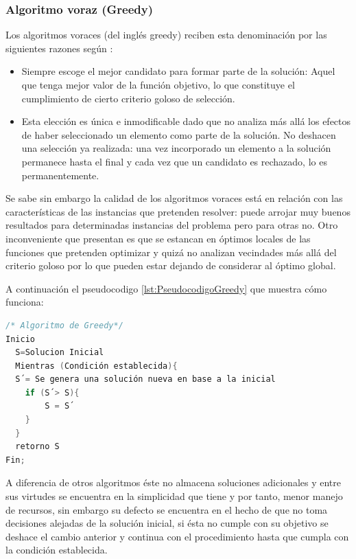 \subsubsection {Algoritmo voraz (Greedy)}
Los algoritmos voraces (del inglés greedy) reciben esta denominación por las siguientes razones según \cite{[CORMENL]}:
\begin{itemize}
\item Siempre escoge el mejor candidato para formar parte de la solución: Aquel que tenga mejor valor de la función objetivo, lo que constituye el cumplimiento de cierto criterio goloso de selección.
\item Esta elección es única e inmodificable dado que no analiza más allá los efectos de haber seleccionado un elemento como parte de la solución. No deshacen una selección ya realizada: una vez incorporado un elemento a la solución permanece hasta el final y cada vez que un candidato es rechazado, lo es permanentemente.
\end{itemize}
\hspace*{1cm}Se sabe sin embargo la calidad de los algoritmos voraces está en relación con las características de las instancias que pretenden resolver: puede arrojar muy buenos resultados para determinadas instancias del problema pero para otras no. Otro inconveniente que presentan es que se estancan en óptimos locales de las funciones que pretenden optimizar y quizá no analizan vecindades más allá del criterio goloso por lo que pueden estar dejando de considerar al óptimo global.

A continuación el pseudocodigo \ref{lst:PseudocodigoGreedy} que muestra cómo funciona:
\begin{lstlisting}[language=C++, caption=Pseudocódigo base para el algoritmo greedy., label=lst:PseudocodigoGreedy]
/* Algoritmo de Greedy*/
Inicio
  S=Solucion Inicial
  Mientras (Condición establecida){
  S´= Se genera una solución nueva en base a la inicial
    if (S´> S){
        S = S´
    }
  }
  retorno S
Fin;
\end{lstlisting}

\hspace*{1cm}A diferencia de otros algoritmos éste no almacena soluciones adicionales y entre sus virtudes se encuentra en la simplicidad que tiene y por tanto, menor manejo de recursos, sin embargo su defecto se encuentra en el hecho de que no toma decisiones alejadas de la solución inicial, si ésta no cumple con su objetivo se deshace el cambio anterior y continua con el procedimiento hasta que cumpla con la condición establecida.\\

